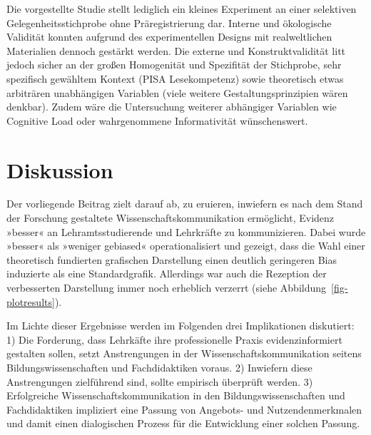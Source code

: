 \documentclass[
  man,
  floatsintext,
  longtable,
  nolmodern,
  notxfonts,
  notimes,
  colorlinks=true,linkcolor=blue,citecolor=blue,urlcolor=blue]{apa7}
\begin{document}
Die vorgestellte Studie stellt lediglich ein kleines Experiment an einer
selektiven Gelegenheitsstichprobe ohne Präregistrierung dar. Interne und
ökologische Validität konnten aufgrund des experimentellen Designs mit
realweltlichen Materialien dennoch gestärkt werden. Die externe und
Konstruktvalidität litt jedoch sicher an der großen Homogenität und
Spezifität der Stichprobe, sehr spezifisch gewähltem Kontext (PISA
Lesekompetenz) sowie theoretisch etwas arbiträren unabhängigen Variablen
(viele weitere Gestaltungsprinzipien wären denkbar). Zudem wäre die
Untersuchung weiterer abhängiger Variablen wie Cognitive Load oder
wahrgenommene Informativität wünschenswert.

\section{Diskussion}\label{diskussion}

Der vorliegende Beitrag zielt darauf ab, zu eruieren, inwiefern es nach
dem Stand der Forschung gestaltete Wissenschaftskommunikation
ermöglicht, Evidenz »besser« an Lehramtsstudierende und Lehrkräfte zu
kommunizieren. Dabei wurde »besser« als »weniger gebiased«
operationalisiert und gezeigt, dass die Wahl einer theoretisch
fundierten grafischen Darstellung einen deutlich geringeren Bias
induzierte als eine Standardgrafik. Allerdings war auch die Rezeption
der verbesserten Darstellung immer noch erheblich verzerrt (siehe
Abbildung~\ref{fig-plotresults}).

Im Lichte dieser Ergebnisse werden im Folgenden drei Implikationen
diskutiert: 1) Die Forderung, dass Lehrkäfte ihre professionelle Praxis
evidenzinformiert gestalten sollen, setzt Anstrengungen in der
Wissenschaftskommunikation seitens Bildungswissenschaften und
Fachdidaktiken voraus. 2) Inwiefern diese Anstrengungen zielführend
sind, sollte empirisch überprüft werden. 3) Erfolgreiche
Wissenschaftskommunikation in den Bildungswissenschaften und
Fachdidaktiken impliziert eine Passung von Angebots- und
Nutzendenmerkmalen und damit einen dialogischen Prozess für die
Entwicklung einer solchen Passung.
\end{document}
